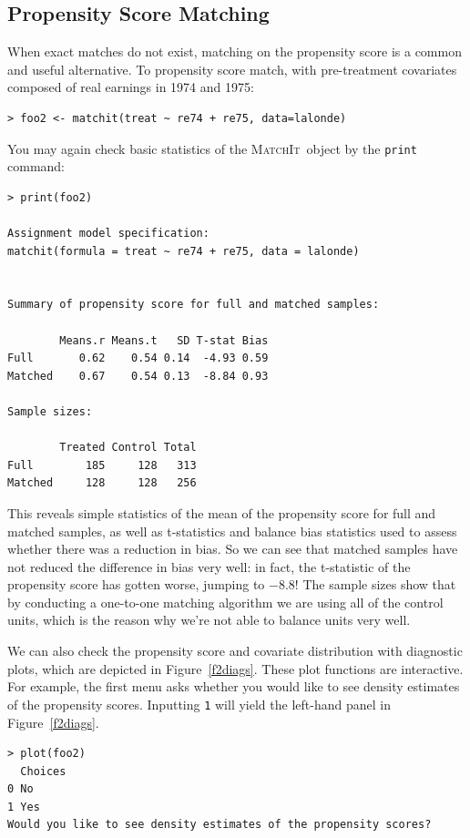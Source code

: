 \documentclass[oneside,letterpaper,titlepage]{article}
\newcommand{\MatchIt}{\textsc{MatchIt}}
\begin{document}
\subsection{Propensity Score Matching}

When exact matches do not exist, matching on the propensity score is a
common and useful alternative.  To propensity score match, with
pre-treatment covariates composed of real earnings in 1974 and 1975:

\begin{verbatim}
> foo2 <- matchit(treat ~ re74 + re75, data=lalonde)
\end{verbatim} 

You may again check basic statistics of the \MatchIt\ object by the
\texttt{print} command:

\begin{verbatim}
> print(foo2)

Assignment model specification:
matchit(formula = treat ~ re74 + re75, data = lalonde)


Summary of propensity score for full and matched samples:

        Means.r Means.t   SD T-stat Bias
Full       0.62    0.54 0.14  -4.93 0.59
Matched    0.67    0.54 0.13  -8.84 0.93

Sample sizes:

        Treated Control Total
Full        185     128   313
Matched     128     128   256
\end{verbatim} 

This reveals simple statistics of the mean of the propensity score for
full and matched samples, as well as t-statistics and balance bias
statistics used to assess whether there was a reduction in bias.  So
we can see that matched samples have not reduced the difference in
bias very well: in fact, the t-statistic of the propensity score has
gotten worse, jumping to $-8.8$!  The sample sizes show that by
conducting a one-to-one matching algorithm we are using all of the
control units, which is the reason why we're not able to balance units
very well. 

We can also check the propensity score and covariate distribution with
diagnostic plots, which are depicted in Figure~\ref{f2diags}.  These
plot functions are interactive.  For example, the first menu asks
whether you would like to see density estimates of the propensity
scores.  Inputting \texttt{1} will yield the left-hand panel in
Figure~\ref{f2diags}.

\begin{verbatim}
> plot(foo2)
  Choices
0 No     
1 Yes    
Would you like to see density estimates of the propensity scores?
\end{verbatim}
\end{document}
